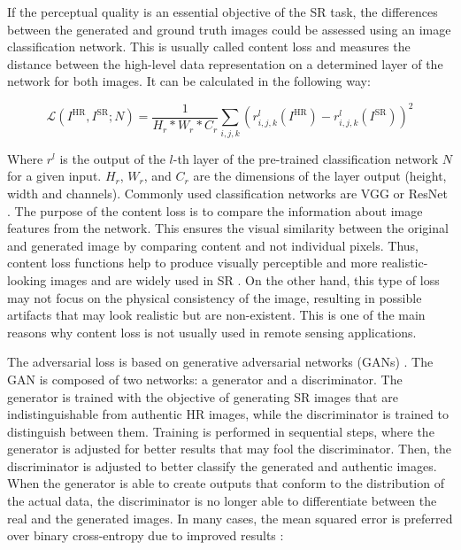         If the perceptual quality is an essential objective of the SR task, the differences between the generated and ground truth images could be assessed using an image classification network. This is usually called content loss and measures the distance between the high-level data representation on a determined layer of the network for both images. It can be calculated in the following way:

        \begin{equation}
            \mathcal{L}(I^{\text{HR}}, I^{\text{SR}}; N) = \frac{1}{H_r*W_r*C_r}\sum_{i,j,k}(r^{l}_{i,j,k}(I^{\text{HR}}) - r^{l}_{i,j,k}(I^{\text{SR}}))^2
        \end{equation}

        Where $r^{l}$ is the output of the $l$-th layer of the pre-trained classification network $N$ for a given input. $H_r$, $W_r$, and $C_r$ are the dimensions of the layer output (height, width and channels). 
        Commonly used classification networks are VGG \cite{simonyan2015deep} or ResNet \cite{he2015deep}.
        The purpose of the content loss is to compare the information about image features from the network. This ensures the visual similarity between the original and generated image by comparing content and not individual pixels. Thus, content loss functions help to produce visually perceptible and more realistic-looking images and are widely used in SR \cite{ledig2017photorealistic,wang2018recovering}. On the other hand, this type of loss may not focus on the physical consistency of the image, resulting in possible artifacts that may look realistic but are non-existent. This is one of the main reasons why content loss is not usually used in remote sensing applications.

        The adversarial loss is based on generative adversarial networks (GANs) \cite{goodfellow2014generative}. The GAN is composed of two networks: a generator and a discriminator. The generator is trained with the objective of generating SR images that are indistinguishable from authentic HR images, while the discriminator is trained to distinguish between them. 
        Training is performed in sequential steps, where the generator is adjusted for better results that may fool the discriminator. Then, the discriminator is adjusted to better classify the generated and authentic images.
        When the generator is able to create outputs that conform to the distribution of the actual data, the discriminator is no longer able to differentiate between the real and the generated images. In many cases, the mean squared error is preferred over binary cross-entropy due to improved results \cite{mao2017squares}: 


